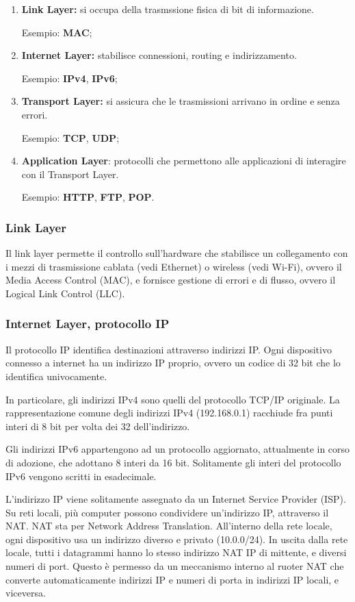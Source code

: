 \documentclass[a4paper,11pt]{article}
\begin{document}
\begin{enumerate}
	\item \textbf{Link Layer:} si occupa della trasmssione fisica di bit di informazione. 
		\par Esempio: \textbf{MAC};
	\item \textbf{Internet Layer:} stabilisce connessioni, routing e indirizzamento.
		\par Esempio: \textbf{IPv4}, \textbf{IPv6};
	\item \textbf{Transport Layer:} si assicura che le trasmissioni arrivano in ordine e senza errori.
		\par Esempio: \textbf{TCP}, \textbf{UDP};
	\item \textbf{Application Layer}: protocolli che permettono alle applicazioni di interagire con il Transport Layer.
		\par Esempio: \textbf{HTTP}, \textbf{FTP}, \textbf{POP}.
\end{enumerate}

\subsubsection{Link Layer}
Il link layer permette il controllo sull'hardware che stabilisce un collegamento con i mezzi di trasmissione cablata (vedi Ethernet) o wireless (vedi Wi-Fi), ovvero il Media Access Control (MAC), e fornisce gestione di errori e di flusso, ovvero il Logical Link Control (LLC).

\subsubsection{Internet Layer, protocollo IP}
Il protocollo IP identifica destinazioni attraverso indirizzi IP.
Ogni dispositivo connesso a internet ha un indirizzo IP proprio, ovvero un codice di 32 bit che lo identifica univocamente.

In particolare, gli indirizzi IPv4 sono quelli del protocollo TCP/IP originale.
La rappresentazione comune degli indirizzi IPv4 (192.168.0.1) racchiude fra punti interi di 8 bit per volta dei 32 dell'indirizzo.

Gli indirizzi IPv6 appartengono ad un protocollo aggiornato, attualmente in corso di adozione, che adottano 8 interi da 16 bit.
Solitamente gli interi del protocollo IPv6 vengono scritti in esadecimale.

L'indirizzo IP viene solitamente assegnato da un Internet Service Provider (ISP).
Su reti locali, più computer possono condividere un'indirizzo IP, attraverso il NAT.
NAT sta per Network Address Translation.
All'interno della rete locale, ogni dispositivo usa un indirizzo diverso e privato (10.0.0/24).
In uscita dalla rete locale, tutti i datagrammi hanno lo stesso indirizzo NAT IP di mittente, e diversi numeri di port.
Questo è permesso da un meccanismo interno al ruoter NAT che converte automaticamente indirizzi IP e numeri di porta in indirizzi IP locali, e viceversa.
\end{document}
